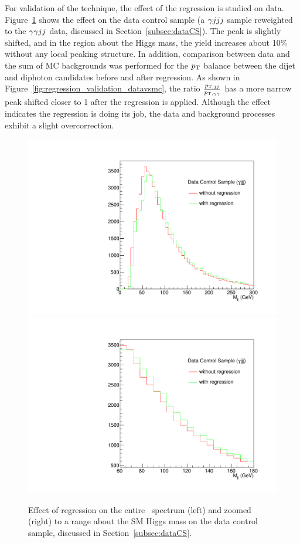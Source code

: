 For validation of the technique, the effect of the regression is studied on data.
Figure~\ref{fig:regression_plots_dataCS_mjj} shows the effect on the data control sample
(a $\gamma jjj$ sample reweighted to the $\gamma\gamma jj$ data, discussed in Section~\ref{subsec:dataCS}). The peak
is slightly shifted, and in the region about the Higgs mass, the yield increases about 10\% without
any local peaking structure. 
In addition, comparison between data and the sum of MC backgrounds was performed for the $p_{\rm T}$
balance between the dijet and diphoton candidates before and after regression.
As shown in Figure~\ref{fig:regression_validation_datavsmc}, the ratio
$\frac{p_{{\rm T},jj}}{p_{{\rm T},\gamma\gamma}}$ has a more narrow peak shifted closer
to 1 after the regression is applied. Although the effect indicates the regression is doing its job,
the data and background processes exhibit a slight overcorrection.

\begin{figure}[ht]
\begin{center}
\includegraphics[width=.4\textwidth]{figures/objects/dataCS_mjj.pdf}
\includegraphics[width=.4\textwidth]{figures/objects/dataCS_mjj_zoom.pdf}
\end{center}
\caption{Effect of regression on the entire \Mjj\, spectrum (left) and zoomed (right)
to a range about the SM Higgs mass on the data control sample, discussed in
Section~\ref{subsec:dataCS}.}
\label{fig:regression_plots_dataCS_mjj} 
\end{figure}

